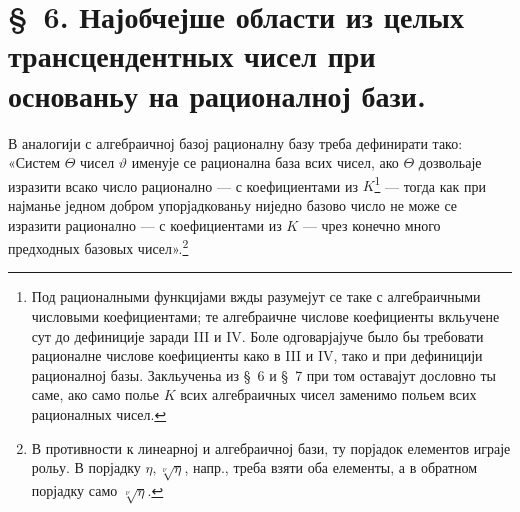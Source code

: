 ﻿\documentclass[11pt]{article}
\begin{document}
\section*{\S\ 6. Најобчејше области из целых трансцендентных чисел при основаньу на рационалној бази.}

В аналогији с алгебраичној базој рационалну базу треба дефинирати тако:
«Систем $\Theta$ чисел $\vartheta$ именује се рационална база всих чисел, ако
$\Theta$ дозвольаје изразити всако число рационално --- с коефициентами из
$K$\footnote{Под рационалными функцијами вжды разумејут се таке с алгебраичными
числовыми коефициентами; те алгебраичне числове коефициенты вкльучене сут до
дефиниције заради III и IV. Боле одговарјајуче было бы требовати рационалне
числове коефициенты како в III и IV, тако и при дефиницији рационалној базы.
Закльученьа из \S\ 6 и \S\ 7 при том оставајут дословно ты саме, ако само полье
$K$ всих алгебраичных чисел заменимо польем всих рационалных чисел.} --- тогда
как при најманье једном добром упорјадкованьу ниједно базово число не може се
изразити рационално --- с коефициентами из $K$ --- чрез конечно много
предходных базовых чисел».\footnote{В противности к линеарној и алгебраичној
бази, ту порјадок елементов играје рольу. В порјадку
$\eta,\sqrt[\nu]{\eta}$, напр., треба взяти оба елементы, а в обратном порјадку
само $\sqrt[\nu]{\eta}$.}
\end{document}
